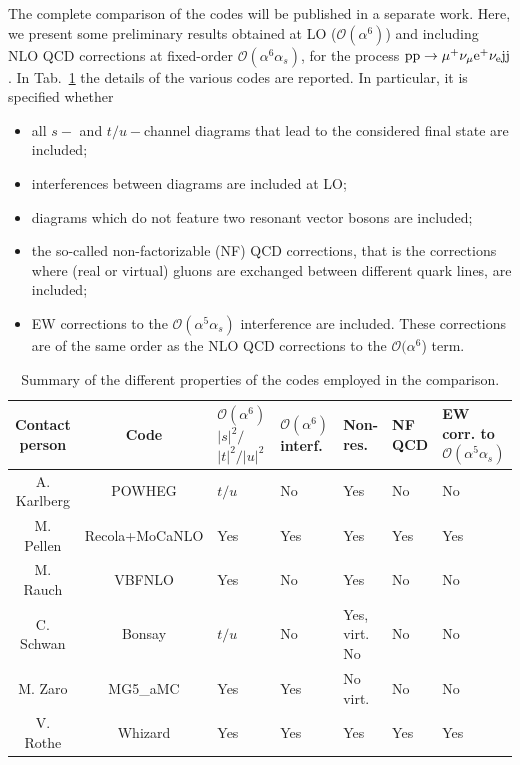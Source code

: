 The complete comparison of the codes will be published in a separate work. Here, we present some preliminary results obtained at LO ($\mathcal O (\alpha^6)$) and including
NLO QCD corrections at fixed-order $\mathcal O (\alpha^6\alpha_s)$, for the process ${\rm p}{\rm p}\to\mu^+\nu_\mu{\rm e}^+\nu_{\rm e}{\rm j}{\rm j}$.
In Tab.~\ref{tab:wg1_codes} the details of the various codes are reported. In particular, it is specified whether
\begin{itemize}
    \item all $s-$ and $t/u-$channel diagrams that lead to the considered final state are included;
    \item interferences between diagrams are included at LO;
    \item diagrams which do not feature two resonant vector bosons are included;
    \item the so-called non-factorizable (NF) QCD corrections, that is the corrections where (real or virtual) gluons are exchanged between different quark lines,
        are included;
    \item EW corrections to the $\mathcal O (\alpha^5\alpha_s)$ interference are included. These corrections are of the same order as the NLO QCD corrections to
        the  $\mathcal O (\alpha^6$) term.
\end{itemize}
%
\begin{table}
    \footnotesize
    \begin{tabularx}{\textwidth}{c|c|X|X|X|X|X}
        Contact person  &  Code  &  $\mathcal O(\alpha^6)$ $|s|^2/$ $|t|^2/|u|^2$  &  $\mathcal O(\alpha^6)$ interf.  &  Non-res.  &  NF QCD  &  EW corr. to $\mathcal O(\alpha^5\alpha_s)$  \\
        \hline
        \hline
        A. Karlberg  &  {\sc POWHEG}  &  $t/u$  &  No  &  Yes  &  No  &  No  \\
        M. Pellen    &  {\sc Recola+MoCaNLO}  &  Yes  &  Yes  &  Yes  &  Yes  &  Yes  \\
        M. Rauch     &  {\sc VBFNLO}  &  Yes  &  No  &  Yes  &  No  &  No  \\
        C. Schwan    &  {\sc Bonsay}  &  $t/u$  &  No  &  Yes, virt. No  &  No  &  No  \\
        M. Zaro      &  {\sc MG5\_aMC}  &  Yes  &  Yes  &  No virt.  &  No  &  No \\
        V. Rothe     &  {\sc Whizard}  &  Yes  &  Yes  &  Yes  &  Yes  &  Yes \\  
    \end{tabularx}
    \caption{\label{tab:wg1_codes} Summary of the different properties of the codes employed in the comparison.}
\end{table}
%

